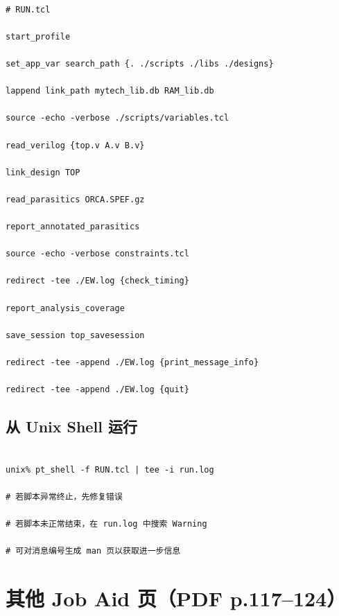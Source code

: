 \label{jobaid:run-tcl}



\begin{lstlisting}

# RUN.tcl

start_profile

set_app_var search_path {. ./scripts ./libs ./designs}

lappend link_path mytech_lib.db RAM_lib.db

source -echo -verbose ./scripts/variables.tcl

read_verilog {top.v A.v B.v}

link_design TOP

read_parasitics ORCA.SPEF.gz

report_annotated_parasitics

source -echo -verbose constraints.tcl

redirect -tee ./EW.log {check_timing}

report_analysis_coverage

save_session top_savesession

redirect -tee -append ./EW.log {print_message_info}

redirect -tee -append ./EW.log {quit}

\end{lstlisting}



\subsection{从 Unix Shell 运行}

\label{jobaid:unix-run}



\begin{lstlisting}

unix% pt_shell -f RUN.tcl | tee -i run.log

# 若脚本异常终止，先修复错误

# 若脚本未正常结束，在 run.log 中搜索 Warning

# 可对消息编号生成 man 页以获取进一步信息

\end{lstlisting}



\section{其他 Job Aid 页（PDF p.117--124）}

